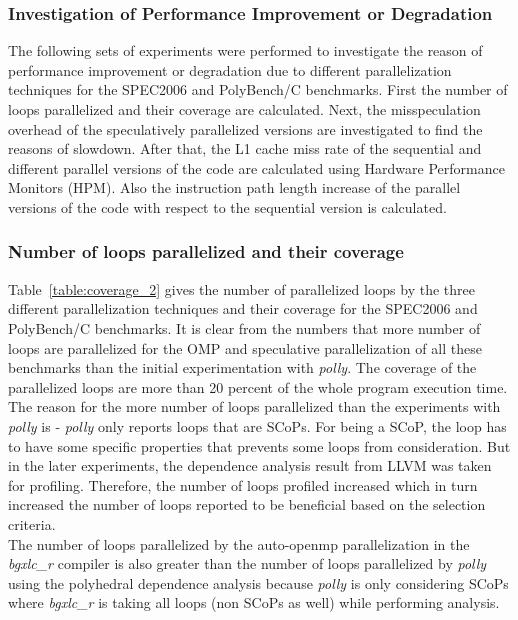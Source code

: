 \documentclass[10pt]{report}          %
\begin{document}
\subsubsection{Investigation of Performance Improvement or Degradation}

The following sets of experiments were performed to investigate the reason of performance improvement or degradation due to different parallelization techniques for the SPEC2006 and PolyBench/C benchmarks.  First the number of loops parallelized and their coverage are calculated.  Next, the misspeculation overhead of the speculatively parallelized versions are investigated to find the reasons of slowdown.  After that, the L1 cache miss rate of the sequential and different parallel versions of the code are calculated using Hardware Performance Monitors (HPM).  Also the instruction path length increase of the parallel versions of the code with respect to the sequential version is calculated.

\subsubsection{Number of loops parallelized and their coverage}

Table~\ref{table:coverage_2} gives the number of parallelized loops by the three different parallelization techniques and their coverage for the SPEC2006 and PolyBench/C benchmarks.  It is clear from the numbers that more number of loops are parallelized for the OMP and speculative parallelization of all these benchmarks than the initial experimentation with \textit{polly}.  The coverage of the parallelized loops are more than 20 percent of the whole program execution time.  The reason for the more number of loops parallelized than the experiments with \textit{polly} is - \textit{polly} only reports loops that are SCoPs.  For being a SCoP, the loop has to have some specific properties that prevents some loops from consideration.  But in the later experiments, the dependence analysis result from LLVM was taken for profiling.  Therefore, the number of loops profiled increased which in turn increased the number of loops reported to be beneficial based on the selection criteria.  \\

The number of loops parallelized by the auto-openmp parallelization in the \textit{bgxlc\_r} compiler is also greater than the number of loops parallelized by \textit{polly} using the polyhedral dependence analysis because \textit{polly} is only considering SCoPs where \textit{bgxlc\_r} is taking all loops (non SCoPs as well) while performing analysis.\\
\end{document}
